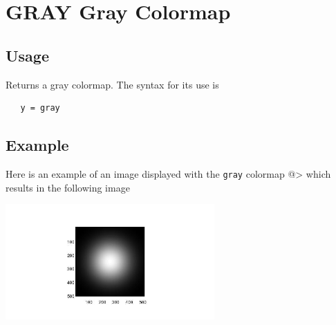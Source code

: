 \section{GRAY Gray Colormap}

\subsection{Usage}

Returns a gray colormap.  The syntax for its use is
\begin{verbatim}
   y = gray
\end{verbatim}
\subsection{Example}

Here is an example of an image displayed with the \verb|gray|
colormap
@>
which results in the following image


\centerline{\includegraphics[width=8cm]{gray1}}

